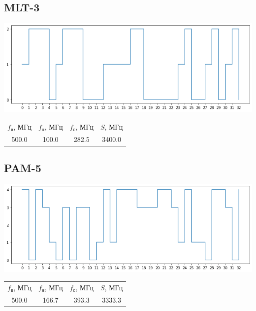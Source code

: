 \subsection{MLT-3}
\includegraphics[width=\textwidth]{3mlt3}
\begin{center}
    \begin{tabular}{cccc}
        $f_\mathrm{\text{в}}$, МГц & $f_\mathrm{\text{н}}$, МГц & $f_\mathrm{\text{с}}$, МГц & $S$, МГц \\
        500.0 & 100.0 & 282.5 & 3400.0 \\
    \end{tabular}
\end{center}

\subsection{PAM-5}
\includegraphics[width=\textwidth]{3pam5}
\begin{center}
    \begin{tabular}{cccc}
        $f_\mathrm{\text{в}}$, МГц & $f_\mathrm{\text{н}}$, МГц & $f_\mathrm{\text{с}}$, МГц & $S$, МГц \\
        500.0 & 166.7 & 393.3 & 3333.3 \\
    \end{tabular}
\end{center}

